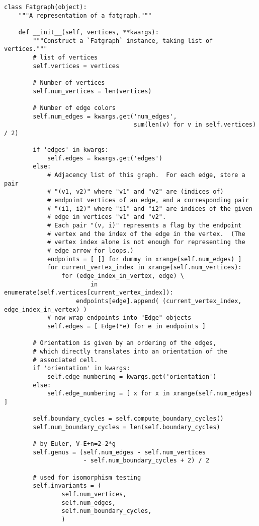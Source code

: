 \begin{lstlisting}
class Fatgraph(object):
    """A representation of a fatgraph."""

    def __init__(self, vertices, **kwargs):
        """Construct a `Fatgraph` instance, taking list of vertices."""
        # list of vertices
        self.vertices = vertices

        # Number of vertices  
        self.num_vertices = len(vertices)

        # Number of edge colors
        self.num_edges = kwargs.get('num_edges',
                                    sum(len(v) for v in self.vertices) / 2)

        if 'edges' in kwargs:
            self.edges = kwargs.get('edges')
        else:
            # Adjacency list of this graph.  For each edge, store a pair
            # "(v1, v2)" where "v1" and "v2" are (indices of)
            # endpoint vertices of an edge, and a corresponding pair
            # "(i1, i2)" where "i1" and "i2" are indices of the given
            # edge in vertices "v1" and "v2".
            # Each pair "(v, i)" represents a flag by the endpoint
            # vertex and the index of the edge in the vertex.  (The
            # vertex index alone is not enough for representing the
            # edge arrow for loops.)
            endpoints = [ [] for dummy in xrange(self.num_edges) ]
            for current_vertex_index in xrange(self.num_vertices):
                for (edge_index_in_vertex, edge) \
                        in enumerate(self.vertices[current_vertex_index]):
                    endpoints[edge].append( (current_vertex_index, edge_index_in_vertex) )
            # now wrap endpoints into "Edge" objects
            self.edges = [ Edge(*e) for e in endpoints ]

        # Orientation is given by an ordering of the edges,
        # which directly translates into an orientation of the
        # associated cell.  
        if 'orientation' in kwargs:
            self.edge_numbering = kwargs.get('orientation')
        else:
            self.edge_numbering = [ x for x in xrange(self.num_edges) ]

        self.boundary_cycles = self.compute_boundary_cycles()
        self.num_boundary_cycles = len(self.boundary_cycles)

        # by Euler, V-E+n=2-2*g
        self.genus = (self.num_edges - self.num_vertices
                      - self.num_boundary_cycles + 2) / 2

        # used for isomorphism testing
        self.invariants = (
                self.num_vertices,
                self.num_edges,
                self.num_boundary_cycles,
                )

\end{lstlisting}

